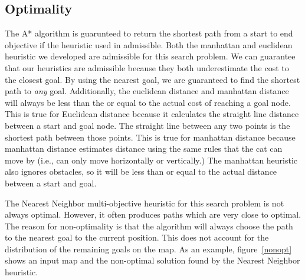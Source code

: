 \documentclass[12pt, conference, compsocconf]{IEEEtran}
\begin{document}
\subsection{Optimality}
The A* algorithm is guarunteed to return the shortest path from a start to end
objective if the heuristic used in admissible.  Both the manhattan and
euclidean heuristic we developed are admissible for this search problem.  We
can guarantee that our heuristics are admissible because they both
underestimate the cost to the closest goal.  By using the nearest goal, we are
guaranteed to find the shortest path to {\em any} goal.  Additionally, the
euclidean distance and manhattan distance will always be less than the or equal
to the actual cost of reaching a goal node.  This is true for Euclidean
distance because it calculates the straight line distance between a start and
goal node.  The straight line between any two points is the shortest path
between those points.  This is true for manhattan distance because manhattan
distance estimates distance using the same rules that the cat can move by
(i.e., can only move horizontally or vertically.)  The manhattan heuristic also
ignores obstacles, so it will be less than or equal to the actual distance
between a start and goal.

The Nearest Neighbor multi-objective heuristic for this search problem is not
always optimal.  However, it often produces paths which are very close to
optimal.  The reason for non-optimality is that the algorithm will always
choose the path to the nearest goal to the current position.  This does not
account for the distribution of the remaining goals on the map.  As an example,
figure~\ref{nonopt} shows an input map and the non-optimal solution found by
the Nearest Neighbor heuristic.
\end{document}
